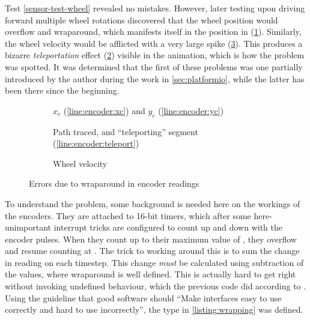 \documentclass[main.tex]{subfiles}
\begin{document}
		Test \ref{sensor-test-wheel} revealed no mistakes.
		However, later testing upon driving forward multiple wheel rotations discovered that the wheel position would overflow and wraparound, which manifests itself in the position in (\cref{fig:bad-wheel:pos}). Similarly, the wheel velocity would be afflicted with a very large spike (\cref{fig:bad-wheel:vel}). This produces a bizarre \emph{teleportation} effect (\cref{fig:bad-wheel:tele}) visible in the animation, which is how the problem was spotted.
		It was determined that the first of these problems was one partially introduced by the author during the work in \cref{sec:platformio}, while the latter has been there since the beginning.

		\begin{figure}
			\newlength{\mypadding}
			\setlength{\mypadding}{1.5cm}
			\newlength{\mywidth}
			\setlength{\mywidth}{(\linewidth-2\mypadding)/3}
			\begin{subfigure}[t]{\mywidth}
				
				\caption{$x_c$ (\ref{line:encoder:xc}) and $y_c$ (\ref{line:encoder:yc})}
				\label{fig:bad-wheel:pos}
			\end{subfigure}\hfill
			\begin{subfigure}[t]{\mywidth}
				
				\caption{Path traced, and \enquote{teleporting} segment (\ref{line:encoder:teleport})}
				\label{fig:bad-wheel:tele}
			\end{subfigure}\hfill
			\begin{subfigure}[t]{\mywidth}
				
				\caption{Wheel velocity}
				\label{fig:bad-wheel:vel}
			\end{subfigure}
			\caption{Errors due to wraparound in encoder readings}
			\label{fig:bad-wheel}
		\end{figure}

		To understand the problem, some background is needed here on the workings of the encoders.
		They are attached to 16-bit timers, which after some here-unimportant interrupt tricks are configured to count up and down with the encoder pulses. When they count up to their maximum value of , they overflow and resume counting at .
		The trick to working around this is to sum the change in reading on each timestep. This change \emph{must} be calculated using  subtraction of the values, where wraparound is well defined. This is actually hard to get right without invoking undefined behaviour, which the previous code did according to \cite[Paragraph~5/4]{cpp-standard}.
		Using the guideline that good software should \enquote{Make interfaces easy to use correctly and hard to use incorrectly}\cite{meyers2004most}, the type in \cref{listing:wrapping} was defined.
\end{document}
